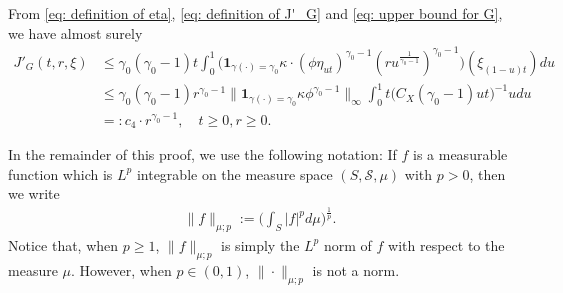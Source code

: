 \documentclass[12pt,a4paper]{amsart}
\theoremstyle{definition}
\numberwithin{equation}{section}
\begin{document}
From \eqref{eq: definition of eta}, \eqref{eq: definition of J'_G} and \eqref{eq: upper bound for G}, we have almost surely
\begin{align}\label{eq: upper bound for J'_G}
	J'_G(t,r,\xi)
	& \leq \gamma_0 (\gamma_0 - 1) t \int_0^1 \big( \mathbf 1_{\gamma(\cdot) = \gamma_0} \kappa \cdot (\phi \eta_{ut})^{\gamma_0 - 1} (ru^{\frac{1}{\gamma_0 - 1}})^{\gamma_0 - 1}\big) (\xi_{(1-u)t}) du
	\\ &\leq \gamma_0(\gamma_0 - 1) r^{\gamma_0 - 1} \big\|   \mathbf 1_{\gamma(\cdot) = \gamma_0}  \kappa \phi^{\gamma_0 - 1} \big\|_\infty \int_0^1 t \big(  C_X(\gamma_0 - 1) ut \big)^{- 1}  u  du
	\\ &=: c_4 \cdot r^{\gamma_0 - 1},
       \quad t\geq 0, r\geq 0.
\end{align}

In the remainder of this proof, we use the following notation:
If $f$ is a measurable function which is $L^p$ integrable on the measure space $(S,\mathscr S,\mu)$ with $p > 0$, then we write
\begin{align}
	\|f\|_{\mu;p}
	:= \Big(\int_{S} |f|^p d\mu \Big)^{\frac{1}{p}}.
\end{align}
Notice that, when $p\geq 1$, $\|f\|_{\mu;p}$ is simply the $L^p$ norm of $f$ with respect to the measure $\mu$.	
However, when $p \in (0,1)$, $\|\cdot\|_{\mu; p}$ is not a norm.
\end{document}
